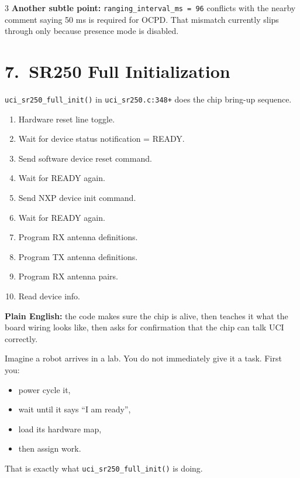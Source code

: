 \documentclass[10pt]{article}
\begin{document}
\begin{multicols*}{3}
\textbf{Another subtle point:}
\texttt{ranging\_interval\_ms = 96} conflicts with the nearby comment saying 50 ms is required for OCPD. That mismatch currently slips through only because presence mode is disabled.

\section*{7.\ SR250 Full Initialization}

\texttt{uci\_sr250\_full\_init()} in \texttt{uci\_sr250.c:348+} does the chip bring-up sequence.

\begin{tcolorbox}[intubox={Initialization Sequence}]
\begin{enumerate}
  \item Hardware reset line toggle.
  \item Wait for device status notification = READY.
  \item Send software device reset command.
  \item Wait for READY again.
  \item Send NXP device init command.
  \item Wait for READY again.
  \item Program RX antenna definitions.
  \item Program TX antenna definitions.
  \item Program RX antenna pairs.
  \item Read device info.
\end{enumerate}
\end{tcolorbox}

\textbf{Plain English:}
the code makes sure the chip is alive, then teaches it what the board wiring looks like, then asks for confirmation that the chip can talk UCI correctly.

\begin{tcolorbox}[analogybox={Analogy --- Introducing A New Robot To A Lab}]
Imagine a robot arrives in a lab.
You do not immediately give it a task.
First you:
\begin{itemize}
  \item power cycle it,
  \item wait until it says ``I am ready'',
  \item load its hardware map,
  \item then assign work.
\end{itemize}
That is exactly what \texttt{uci\_sr250\_full\_init()} is doing.
\end{tcolorbox}


\end{multicols*}
\end{document}
